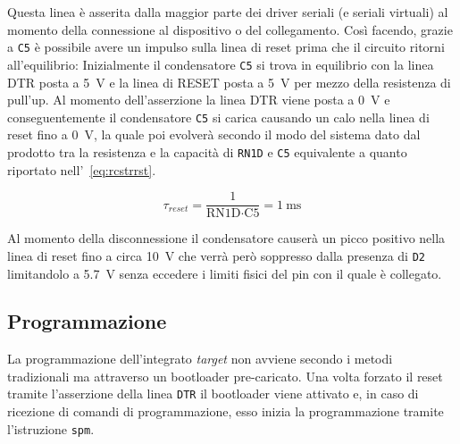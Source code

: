 Questa linea è asserita dalla maggior parte dei driver seriali (e seriali virtuali) al momento della connessione al dispositivo o del collegamento. Così facendo, grazie a \texttt{C5} è possibile avere un impulso sulla linea di reset prima che il circuito ritorni all'equilibrio: Inizialmente il condensatore \texttt{C5} si trova in equilibrio con la linea DTR posta a \SI{5}{\volt} e la linea di RESET posta a \SI{5}{\volt} per mezzo della resistenza di pull'up. Al momento dell'asserzione la linea DTR viene posta a \SI{0}{\volt} e conseguentemente il condensatore \texttt{C5} si carica causando un calo nella linea di reset fino a \SI{0}{\volt}, la quale poi evolverà secondo il modo del sistema dato dal prodotto tra la resistenza e la capacità di \texttt{RN1D} e \texttt{C5} equivalente a quanto riportato nell'~\cref{eq:rcstrrst}.

\begin{equation}\label{eq:rcstrrst}
    \tau_{reset} = \frac{1}{\text{RN1D} \cdot \text{C5}} = \SI{1}{\milli\second}
\end{equation}

Al momento della disconnessione il condensatore causerà un picco positivo nella linea di reset fino a circa \SI{10}{\volt} che verrà però soppresso dalla presenza di \texttt{D2} limitandolo a \SI{5.7}{\volt} senza eccedere i limiti fisici del pin con il quale è collegato.

\subsection{Programmazione}

La programmazione dell'integrato \textit{target} non avviene secondo i metodi tradizionali ma attraverso un bootloader pre-caricato\cite[bootloaders/atmega/ATmegaBOOT\_168.c]{git:arduinocore}. 
Una volta forzato il reset tramite l'asserzione della linea \texttt{DTR} il bootloader viene attivato e, in caso di ricezione di comandi di programmazione, esso inizia la programmazione tramite l'istruzione \texttt{spm}.

